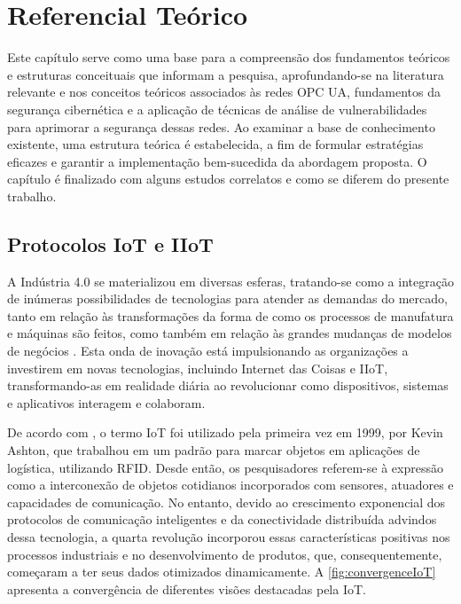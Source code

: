 \chapter{Referencial Teórico} \label{cap:refTeorico}

    Este capítulo serve como uma base para a compreensão dos fundamentos teóricos e estruturas conceituais que informam a pesquisa, aprofundando-se na literatura relevante e nos conceitos teóricos associados às redes OPC UA, fundamentos da segurança cibernética e a aplicação de técnicas de análise de vulnerabilidades para aprimorar a segurança dessas redes. Ao examinar a base de conhecimento existente, uma estrutura teórica é estabelecida, a fim de formular estratégias eficazes e garantir a implementação bem-sucedida da abordagem proposta. O capítulo é finalizado com alguns estudos correlatos e como se diferem do presente trabalho.
    
    \section{Protocolos IoT e IIoT} \label{sec:protocolos}
    
    A Indústria 4.0 se materializou em diversas esferas, tratando-se como a integração de inúmeras possibilidades de tecnologias para atender as demandas do mercado, tanto em relação às transformações da forma de como os processos de manufatura e máquinas são feitos, como também em relação às grandes mudanças de modelos de negócios \cite{trotta2018}. Esta onda de inovação está impulsionando as organizações a investirem em novas tecnologias, incluindo Internet das Coisas e IIoT, transformando-as em realidade diária ao revolucionar como dispositivos, sistemas e aplicativos interagem e colaboram.
    
    De acordo com , o termo IoT foi utilizado pela primeira vez em 1999, por Kevin Ashton, que trabalhou em um padrão para marcar objetos em aplicações de logística, utilizando RFID. Desde então, os pesquisadores referem-se à expressão como a interconexão de objetos cotidianos incorporados com sensores, atuadores e capacidades de comunicação. No entanto, devido ao crescimento exponencial dos protocolos de comunicação inteligentes e da conectividade distribuída advindos dessa tecnologia, a quarta revolução incorporou essas características positivas nos processos industriais e no desenvolvimento de produtos, que, consequentemente, começaram a ter seus dados otimizados dinamicamente. A \autoref{fig:convergenceIoT} apresenta a convergência de diferentes visões destacadas pela IoT.

